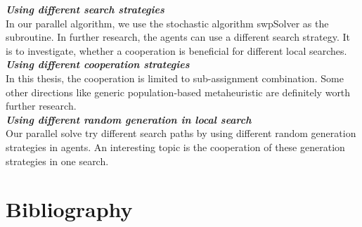 \documentclass[12pt,a4paper,twoside]{scrartcl}
\numberwithin{equation}{section}
\begin{document}
\emph{\textbf{Using different  search strategies}}\\
In our parallel algorithm, we use the stochastic algorithm swpSolver as the subroutine. In further research, the agents can use a different search strategy. It is to investigate, whether a cooperation is beneficial for different local searches.\\

\emph{\textbf{Using different cooperation strategies}}\\
In this thesis, the cooperation is limited to sub-assignment combination. Some other directions like generic population-based metaheuristic are definitely worth further research.\\

\emph{\textbf{Using different random generation in local search}}\\
Our parallel solve try different search paths by using different random generation strategies in agents. An interesting topic is the cooperation of these generation strategies in one search.
\clearpage
\section{Bibliography}


\end{document}
